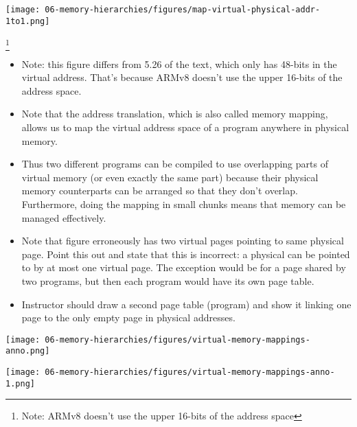 \begin{frame}[fragile]
\bigskip
{\texttt{[image: 06-memory-hierarchies/figures/map-virtual-physical-addr-1to1.png]}}

\footnote{Note: ARMv8 doesn't use the upper 16-bits
  of the address space}

\BNotes\ifnum{}
\begin{itemize}
\item Note: this figure differs from 5.26 of the text, which only has 48-bits
  in the virtual address.  That's because ARMv8 doesn't use the upper 16-bits
  of the address space.
\item Note that the address translation, which is also called memory
  mapping, allows us to map the virtual address space of a program
  anywhere in physical memory. 
\item Thus two different programs can be
  compiled to use overlapping parts of virtual memory (or even exactly
  the same part) because their physical memory counterparts can be
  arranged so that they don't overlap. Furthermore, doing the mapping in
  small chunks means that memory can be managed effectively. 

\item Note that figure erroneously has two virtual pages pointing to
	same physical page.  Point this out and state that this is
	incorrect: a physical can be pointed to by at most one virtual
	page.  The exception would be for a page shared by two programs,
        but then each program would have its own page table.

\item Instructor should draw a second page table (program) and show it
	linking one page to the only empty page in physical addresses.
\end{itemize}
\fi\ENotes
\end{frame}

\begin{frame}[fragile]
\bigskip
{\texttt{[image: 06-memory-hierarchies/figures/virtual-memory-mappings-anno.png]}}
\end{frame}

\begin{frame}[fragile]
\bigskip
{\texttt{[image: 06-memory-hierarchies/figures/virtual-memory-mappings-anno-1.png]}}
\end{frame}

